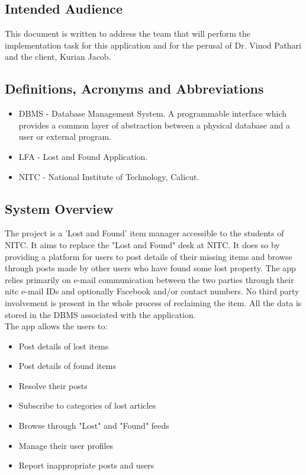 \documentclass[a4paper,12pt]{article}
\begin{document}
\subsection{Intended Audience}
This document is written to address the team that will perform the implementation task for this application and for the perusal of Dr. Vinod Pathari and the client, Kurian Jacob.
\subsection{Definitions, Acronyms and Abbreviations}
\begin{itemize}
\item DBMS - Database Management System.  A programmable interface which provides a common layer of abstraction between a physical database and a user or external program.
\item LFA - Lost and Found Application.
\item NITC - National Institute of Technology, Calicut.
\end{itemize}
\subsection{System Overview}
The project is a 'Lost and Found' item manager accessible to the students of NITC. It aims to replace the "Lost and Found" desk at NITC. It does so by providing a platform for users to post details of their missing items and browse through posts made by other users who have found some lost property. The app relies primarily on e-mail communication between the two parties through their nitc e-mail IDs and optionally Facebook and/or contact numbers. No third party involvement is present in the whole process of reclaiming the item. All the data is stored in the DBMS associated with the application.\\
The app allows the users to:\\
\begin{itemize}
\item Post details of lost items
\item Post details of found items
\item Resolve their posts
\item Subscribe to categories of lost articles
\item Browse through "Lost" and "Found" feeds
\item Manage their user profiles
\item Report inappropriate posts and users
\end{itemize}
\end{document}
